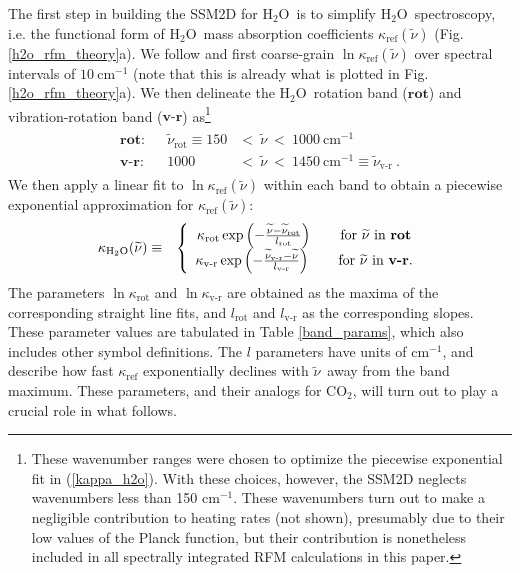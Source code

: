 \documentclass{ametsoc}
\newcommand{\beqa}{\begin{eqnarray}}
\newcommand{\eeqa}{\end{eqnarray}}
\newcommand{\eqnref}[1]{(\ref{#1})}
\newcommand{\cminverse}{\ensuremath{\mathrm{cm^{-1}}}}
\newcommand{\cotwo}{\ensuremath{\mathrm{CO_2}}}
\newcommand{\htwo}{\ensuremath{\mathrm{H_2O}}}
\newcommand{\wv}{\ensuremath{\widetilde{\nu}}}
\newcommand{\kapparef}{\ensuremath{\kappa_{\mathrm{ref}}}}
\newcommand{\kapparot}{\ensuremath{\kappa_{\mathrm{rot}}}}
\newcommand{\kappavr}{\ensuremath{\kappa_{\text{v-r}}}}
\newcommand{\krot}{\ensuremath{\wv_\mathrm{rot}}}
\newcommand{\kvr}{\ensuremath{\wv_\text{v-r}}}
\newcommand{\lrot}{\ensuremath{l_\mathrm{rot}}}
\newcommand{\lvr}{\ensuremath{l_\text{v-r}}}
\newcommand{\vr}{\ensuremath{\textbf{v-r}}}
\newcommand{\rot}{\ensuremath{\textbf{rot}}}
\begin{document}
The first step in building the SSM2D for \htwo\ is to simplify \htwo\ spectroscopy, i.e. the functional form of \htwo\ mass absorption coefficients $\kapparef(\wv)$ (Fig. \ref{h2o_rfm_theory}a). We follow \cite{wilson2012} and first coarse-grain $\ln \kapparef(\wv)$ over spectral intervals of $10 \ \cminverse$ (note that this is already what is plotted in Fig. \ref{h2o_rfm_theory}a). We then delineate the  \htwo\ rotation band (\rot) and vibration-rotation band (\vr)  as\footnote{These wavenumber ranges were chosen to optimize the piecewise exponential fit in \eqnref{kappa_h2o}. With these choices, however, the SSM2D neglects wavenumbers less than 150 \cminverse. These wavenumbers turn out to make a negligible contribution to heating rates (not shown), presumably due to their low values of the Planck function, but their contribution is nonetheless included in all spectrally integrated RFM calculations in this paper.}
\beqa
	\begin{split}
	    \rot :  & & \krot \equiv 150 & <\  \wv\  < \ 1000\ \cminverse \\
    		\vr : & &  1000 & < \  \wv\ <\  1450\ \cminverse \equiv \kvr   \ .
	\end{split}
	\label{h2o_bands}
\eeqa
 We then apply a linear fit to $\ln \kapparef(\wv)$ within each band  to obtain a piecewise exponential approximation for $\kapparef(\wv)$:
 \beqa
 	\kappa_{\htwo}(\wv) & \equiv & \left\{ \begin{array}{cr} 
													\kapparot \exp\left(-\frac{\wv-\krot}{\lrot}\right) \quad \quad \text{for $\wv$ in \rot}  \\
												    \kappavr \exp\left(-\frac{\kvr-\wv}{\lvr}\right)   \quad \quad \text{for $\wv$ in \vr} .
												      \end{array} \right.          
\label{kappa_h2o}
 \eeqa
 The parameters $\ln\kapparot$ and $\ln \kappavr$ are obtained as the maxima of the corresponding straight line fits, and $\lrot$ and $\lvr$ as the corresponding slopes. These parameter values are tabulated in Table \ref{band_params}, which also includes other symbol definitions. The $l$ parameters have units of \cminverse, and describe how fast $\kapparef$ exponentially declines with \wv\ away from the band maximum. These parameters, and their analogs for \cotwo, will turn out to play a crucial role in what follows.
 
\end{document}
